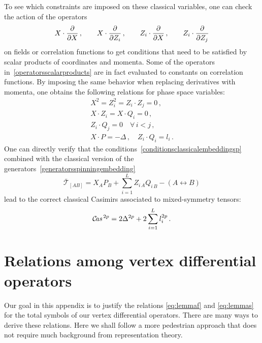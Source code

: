 \documentclass{article}
\begin{document}
	To see which constraints are imposed on these classical variables, one can check the action of the operators
	\begin{equation}
	    X\cdot \pdv{X}\,, \qquad X\cdot \pdv{Z_i}\,, \qquad Z_i\cdot \pdv{X}\,, \qquad Z_i\cdot \pdv{Z_j}
	    \label{operatorsscalarproducts}
	\end{equation}
	on fields or correlation functions to get conditions that need to be satisfied by scalar products of coordinates and momenta. Some of the operators in~\eqref{operatorsscalarproducts} are in fact evaluated to constants on correlation functions. By imposing the same behavior when replacing derivatives with momenta, one obtains the following relations for phase space variables:
\begin{equation}
\begin{gathered}
    X^2=Z_i^2=Z_i\cdot Z_j=0\,,\\
    X\cdot Z_i=X\cdot Q_i=0\,,\\
    Z_i\cdot Q_j=0 \quad\forall\, i<j\,,\\
    X\cdot P=-\Delta\,, \quad Z_i\cdot Q_i=l_i\,.
    \end{gathered}
    \label{conditionsclassicalembeddingsp}
\end{equation}
	One can directly verify that the conditions~\eqref{conditionsclassicalembeddingsp} combined with the classical version of the generators~\eqref{generatorsspinningembedding}
	\begin{equation}\label{eq:TABspin}
	    \bar{\mathcal{T}}_{[AB]}=X_A P_B+\sum_{i=1}^L Z_{i\,A}Q_{i\,B} - (A\leftrightarrow B)
	\end{equation}
	lead to the correct classical Casimirs associated to mixed-symmetry tensors:
	\begin{equation}\label{eq:ClassicalCas}
	    \mathcal{C}\textit{\!as\,}^{2p}=2\Delta^{2p}+2\sum_{i=1}^{L} l_i^{2p}\,.
	\end{equation}

\section{Relations among vertex differential operators} 
\label{appendix:prooflemma}

Our goal in this appendix is to justify the relations \eqref{eq:lemmaf} and \eqref{eq:lemmas}
for the total symbols of our vertex differential operators. There are many ways to derive these 
relations. Here we shall follow a more pedestrian approach that does not require much background from 
representation theory. 
\end{document}
